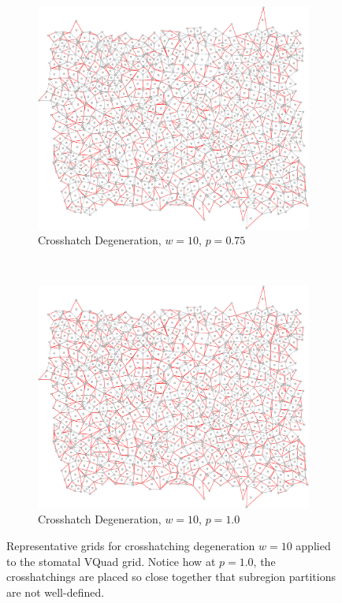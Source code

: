 \documentclass[a4paper,11pt]{article}
\begin{document}
\begin{figure}[htp]
\begin{subfigure}[t]{0.45\textwidth}
  \end{subfigure}

\begin{subfigure}[t]{0.45\textwidth}
  \centering
  \includegraphics[width=\textwidth]{ch6_figs/cross_hatch_p75_w10}
  \caption{Crosshatch Degeneration, $w=10$, $p=0.75$}

  \end{subfigure}
~
\begin{subfigure}[t]{0.45\textwidth}
  \centering
  \includegraphics[width=\textwidth]{ch6_figs/cross_hatch_p100_w10}
  \caption{Crosshatch Degeneration, $w=10$, $p=1.0$}

  \end{subfigure}

\caption[Crosshatch Degeneration, $w=10$]{
  Representative grids for crosshatching degeneration $w=10$ applied to the stomatal VQuad grid. Notice how at $p=1.0$, the crosshatchings are placed so close together that subregion partitions are not well-defined.
}
\label{fig:ch_w10_grid}
\end{figure}
\end{document}
